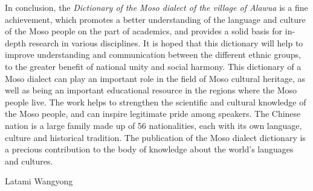 In conclusion, the \emph{Dictionary of the Moso dialect of the village of Alawua} is a fine achievement, which promotes a better understanding of the language and culture of the Moso people on the part of academics, and provides a solid basis for in-depth research in various disciplines. It is hoped that this dictionary will help to improve understanding and communication between the different ethnic groups, to the greater benefit of national unity and social harmony. This dictionary of a Moso dialect can play an important role in the field of Moso cultural heritage, as well as being an important educational resource in the regions where the Moso people live. The work helps to strengthen the scientific and cultural knowledge of the Moso people, and can inspire legitimate pride among speakers. The Chinese nation is a large family made up of 56 nationalities, each with its own language, culture and historical tradition. The publication of the Moso dialect dictionary is a precious contribution to the body of knowledge about the world's languages and cultures.

{\raggedleft Latami Wangyong \par}


